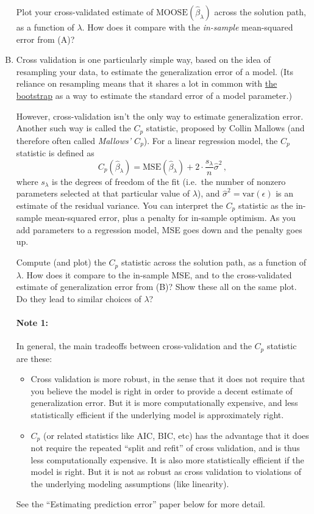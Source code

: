 \documentclass{article}
\begin{document}
\begin{enumerate}[(A)]
Plot your cross-validated estimate of $\mathrm{MOOSE}(\hat{\beta}_{\lambda})$ across the solution path, as a function of $\lambda$.  How does it compare with the \textit{in-sample} mean-squared error from (A)?

\item Cross validation is one particularly simple way, based on the idea of resampling your data, to estimate the generalization error of a model.  (Its reliance on resampling means that it shares a lot in common with \href{https://en.wikipedia.org/wiki/Bootstrapping_(statistics)}{the bootstrap} as a way to estimate the standard error of a model parameter.)

However, cross-validation isn't the only way to estimate generalization error.  Another such way is called the $C_p$ statistic, proposed by Collin Mallows (and therefore often called \textit{Mallows' $C_p$}).  For a linear regression model, the $C_p$ statistic is defined as
$$
C_p(\hat{\beta}_\lambda) = \mathrm{MSE}(\hat \beta_{\lambda}) + 2 \cdot \frac{s_{\lambda}}{n} \hat \sigma^2 \, ,
$$
where $s_{\lambda}$ is the degrees of freedom of the fit (i.e.~the number of nonzero parameters selected at that particular value of $\lambda$), and $\hat \sigma^2 = \mathrm{var}(\epsilon)$ is an estimate of the residual variance.  You can interpret the $C_p$ statistic as the in-sample mean-squared error, plus a penalty for in-sample optimism.  As you add parameters to a regression model, MSE goes down and the penalty goes up. 

Compute (and plot) the $C_p$ statistic across the solution path, as a function of $\lambda$.  How does it compare to the in-sample MSE, and to the cross-validated estimate of generalization error from (B)?  Show these all on the same plot.  Do they lead to similar choices of $\lambda$?

\paragraph{Note 1:} In general, the main tradeoffs between cross-validation and the $C_p$ statistic are these:
\begin{itemize}
\item  Cross validation is more robust, in the sense that it does not require that you believe the model is right in order to provide a decent estimate of generalization error.  But it is more computationally expensive, and less statistically efficient if the underlying model is approximately right.
\item $C_p$ (or related statistics like AIC, BIC, etc) has the advantage that it does not require the repeated ``split and refit'' of cross validation, and is thus less computationally expensive.  It is also more statistically efficient if the model is right.  But it is not as robust as cross validation to violations of the underlying modeling assumptions (like linearity).
\end{itemize}
See the ``Estimating prediction error'' paper below for more detail.


\end{enumerate}
\end{document}
